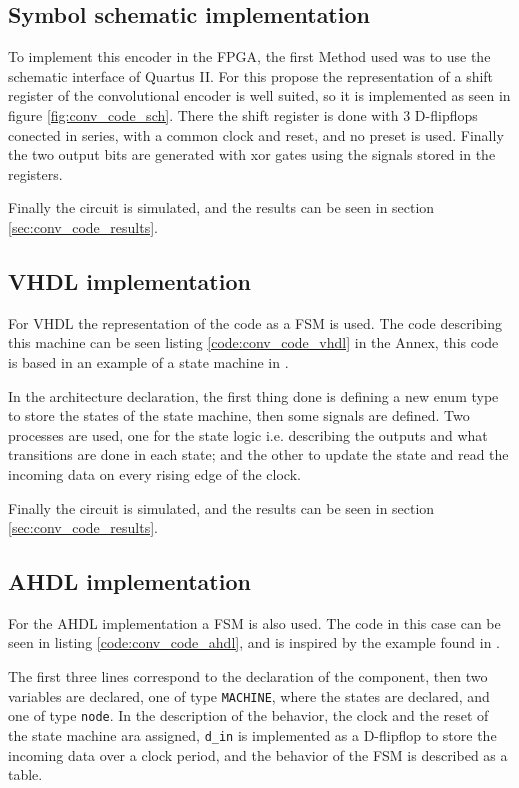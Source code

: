 \documentclass[12pt]{article}   	%
\begin{document}
\subsection{Symbol schematic implementation}

To implement this encoder in the FPGA, the first Method used was to use the schematic interface of Quartus II. For this propose the representation of a shift register of the convolutional encoder is well suited, so it is implemented as seen in figure \ref{fig:conv_code_sch}. There the shift register is done with 3 D-flipflops conected in series, with a common clock and reset, and no preset is used. Finally the two output bits are generated with xor gates using the signals stored in the registers.

Finally the circuit is simulated, and the results can be seen in section \ref{sec:conv_code_results}.


\subsection{VHDL implementation}
For VHDL the representation of the code as a FSM is used. The code describing this machine can be seen listing \ref{code:conv_code_vhdl} in the Annex, this code is based in an example of a state machine in \cite{vhdl_douglas}.

In the architecture declaration, the first thing done is defining a new enum type to store the states of the state machine, then some signals are defined. Two processes are used, one for the state logic i.e. describing the outputs and what transitions are done in each state; and the other to update the state and read the incoming data on every rising edge of the clock.

Finally the circuit is simulated, and the results can be seen in section \ref{sec:conv_code_results}.



\subsection{AHDL implementation}
For the AHDL implementation a FSM is also used. The code in this case can be seen in listing \ref{code:conv_code_ahdl}, and is inspired by the example found in \cite{ahdl}.

The first three lines correspond to the declaration of the component, then two variables are declared, one of type \lstinline{MACHINE}, where the states are declared, and one of type \lstinline{node}. In the description of the behavior, the clock and the reset of the state machine ara assigned, \lstinline{d_in} is implemented as a D-flipflop to store the incoming data over a clock period, and the behavior of the FSM is described as a table.
\end{document}
